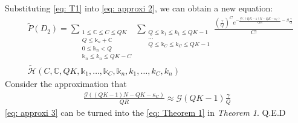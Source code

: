 \documentclass[a4paper]{IEEEtran}
\begin{document}
Substituting \eqref{eq: T1} into \eqref{eq: approxi 2}, we can obtain a new equation:
\begin{equation}
\begin{split}
&\widetilde{P}(D_2) = 
\sum\limits_{
\substack{
1 \leq \mathbb{C} \leq C \leq QK\\
Q \leq \mathbb{k}_n + \mathbb{C}\\
0 \leq \mathbb{k}_n < Q\\
\mathbb{k}_n \leq k_n \leq QK - C
}
}
\sum\limits_{
\substack{
Q \leq \mathbb{k}_1 \leq k_1 \leq QK - 1\\
\dots\\
Q \leq \mathbb{k}_C \leq k_C \leq QK - 1
}}
\frac{(\frac{\gamma}{Q})^{C}
e^{-\frac{\mathcal{G}((QK-1)N - QK -\kappa_{C})}{QR} - \mathcal{G}\frac{\gamma}{Q}}}{C!}
\\
&\widetilde{\mathcal{H}}(C, \mathbb{C}, QK, \mathbb{k}_{1}, \dots, \mathbb{k}_{C}, \mathbb{k}_{n}, k_{1}, \dots, k_{C}, k_{n})
 \end{split}
 \label{eq: approxi 3}
\end{equation}
Consider the approximation that
\begin{equation}
\begin{split}
\frac{\mathcal{G}((QK-1)N - QK -\kappa_{C})}{QR} \approx 
{\mathcal{G}(QK-1)\frac{\gamma}{Q}}
\end{split}
\end{equation}
\eqref{eq: approxi 3} can be turned into the \eqref{eq: Theorem 1} in \textit{Theorem 1}.
Q.E.D


\end{document}
